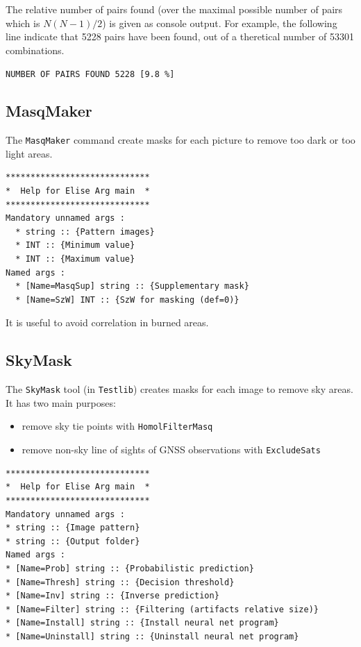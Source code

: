 \noindent The relative number of pairs found (over the maximal possible number of pairs which is $N(N-1)/2$) is given as console output. For example, the following line indicate that 5228 pairs have been found, out of a theretical number of 53301 combinations. \newline

\texttt{NUMBER OF PAIRS FOUND       5228                [9.8 \%]} \newline



\subsection{MasqMaker}
The {\tt MasqMaker} command create masks for each picture to remove too dark or too light areas.

\begin{verbatim}
*****************************
*  Help for Elise Arg main  *
*****************************
Mandatory unnamed args : 
  * string :: {Pattern images}
  * INT :: {Minimum value}
  * INT :: {Maximum value}
Named args : 
  * [Name=MasqSup] string :: {Supplementary mask}
  * [Name=SzW] INT :: {SzW for masking (def=0)}
\end{verbatim}

It is useful to avoid correlation in burned areas.



\subsection{SkyMask}

The {\tt SkyMask} tool (in {\tt Testlib}) creates masks for each image to remove sky areas. It has two main purposes: \newline

\begin{itemize}
	\item remove sky tie points with \texttt{HomolFilterMasq}
	\item remove non-sky line of sights of GNSS observations with \texttt{ExcludeSats} \newline
\end{itemize}

\begin{verbatim}
*****************************
*  Help for Elise Arg main  *
*****************************
Mandatory unnamed args : 
* string :: {Image pattern}
* string :: {Output folder}
Named args : 
* [Name=Prob] string :: {Probabilistic prediction}
* [Name=Thresh] string :: {Decision threshold}
* [Name=Inv] string :: {Inverse prediction}
* [Name=Filter] string :: {Filtering (artifacts relative size)}
* [Name=Install] string :: {Install neural net program}
* [Name=Uninstall] string :: {Uninstall neural net program}
\end{verbatim}

